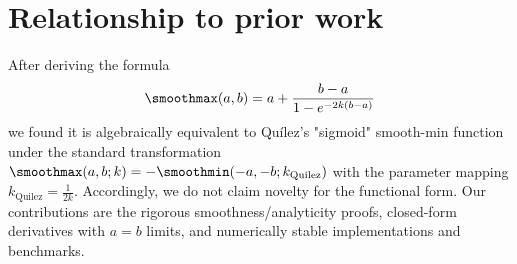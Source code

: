 \section{Relationship to prior work}

After deriving the formula
\begin{align}
    \smoothmax(a,b) = a + \frac{b - a}{1-e^{-2k(b - a)}}
\end{align}
we found it is algebraically equivalent to Quílez's "sigmoid" smooth-min function \cite{Quilez2013} under the standard transformation $\smoothmax(a,b; k) = -\smoothmin(-a,-b;k_\text{Quilez})$ with the parameter mapping $k_\text{Quilez} = \frac{1}{2k}$. Accordingly, we do not claim novelty for the functional form. Our contributions are the rigorous smoothness/analyticity proofs, closed-form derivatives with $a = b$ limits, and numerically stable implementations and benchmarks.
